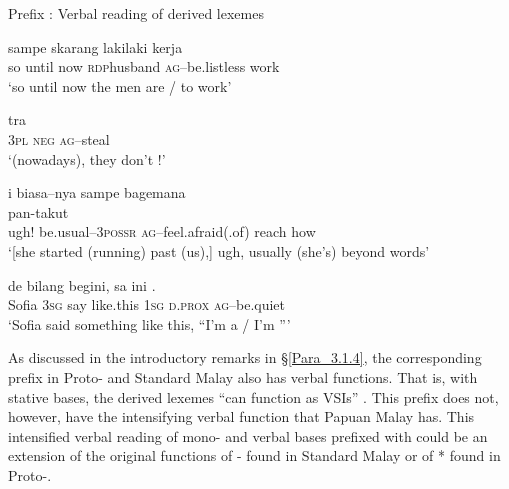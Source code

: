 \begin{styleExampleTitle}
Prefix : Verbal reading of derived lexemes
\end{styleExampleTitle}

\ea
\label{Example_3.26}
 {sampe} {skarang} {laki{\Tilde}laki} {} {kerja}\\ %
 so  until  now  \textsc{rdp}{\Tilde}husband  \textsc{ag}–be.listless  work\\
\glt 
‘so until now the men are   /  to work’ \textstyleExampleSource{[081014-007-CvEx.0087]}
\z

\ea
\label{Example_3.27}
 {tra} {}\\ %
 \textsc{3pl}  \textsc{neg}  \textsc{ag}–steal\\
\glt 
‘(nowadays), they don’t \bluebold{)}!’ \textstyleExampleSource{[081011-022-Cv.0298]}
\z

\ea
\label{Example_3.28}
\glll {\ldots} {i} {biasa–nya}  {sampe} {bagemana}\\ %
{} {} {} pan-takut\\
 { }   ugh!  be.usual–\textsc{3possr}  \textsc{ag}–feel.afraid(.of)  reach  how\\
 ‘[she started (running) past (us),] ugh, usually (she’s)  beyond words’ \textstyleExampleSource{[081025-006-Cv.0328]}
\z

\ea
\label{Example_3.29}
 {de} {bilang} {begini,} {sa} {ini} {.}\\ %
 Sofia  \textsc{3sg}  say  like.this  \textsc{1sg}  \textsc{d.prox}  \textsc{ag}–be.quiet\\

\glt 
‘Sofia said something like this, ``I’m a  / I’m ''' \textstyleExampleSource{[081115-001a-Cv.0190]}
\z


As discussed in the introductory remarks in §\ref{Para_3.1.4}, the corresponding prefix in Proto- and Standard Malay also has verbal functions. That is, with  stative bases, the derived lexemes “can function as VSIs” \citep[183]{Adelaar.1992}. This prefix does not, however, have the intensifying verbal function that Papuan Malay  has. This intensified verbal reading of mono- and  verbal bases prefixed with  could be an extension of the original functions of - found in Standard Malay or of *\textitbf{-} found in Proto-.



